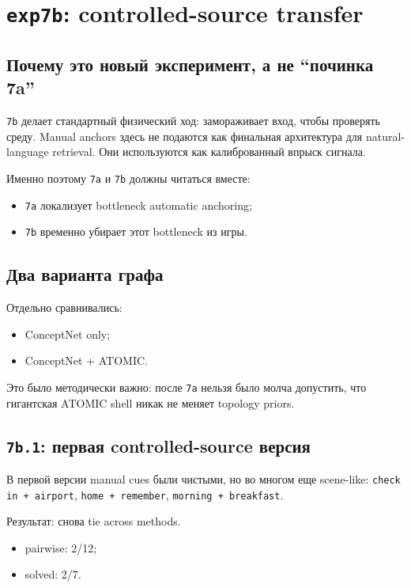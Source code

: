 \section{\texttt{exp7b}: controlled-source transfer}

\subsection{Почему это новый эксперимент, а не ``починка 7a''}

\texttt{7b} делает стандартный физический ход: замораживает вход, чтобы
проверять среду. Manual anchors здесь не подаются как финальная архитектура для
natural-language retrieval. Они используются как калиброванный впрыск сигнала.

Именно поэтому \texttt{7a} и \texttt{7b} должны читаться вместе:

\begin{itemize}[leftmargin=2em]
\item \texttt{7a} локализует bottleneck automatic anchoring;
\item \texttt{7b} временно убирает этот bottleneck из игры.
\end{itemize}

\subsection{Два варианта графа}

Отдельно сравнивались:

\begin{itemize}[leftmargin=2em]
\item ConceptNet only;
\item ConceptNet + ATOMIC.
\end{itemize}

Это было методически важно: после \texttt{7a} нельзя было молча допустить, что
гигантская ATOMIC shell никак не меняет topology priors.

\subsection{\texttt{7b.1}: первая controlled-source версия}

В первой версии manual cues были чистыми, но во многом еще scene-like:
\texttt{check in + airport}, \texttt{home + remember}, \texttt{morning +
breakfast}.

Результат: снова tie across methods.

\begin{itemize}[leftmargin=2em]
\item pairwise: 2/12;
\item solved: 2/7.
\end{itemize}

